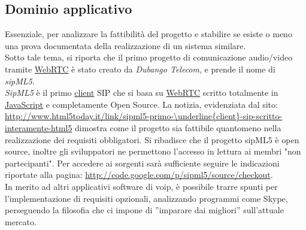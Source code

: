 \subsection{Dominio applicativo}
Essenziale, per analizzare la fattibilità del progetto e stabilire se esiste o meno una prova documentata della realizzazione di un sistema similare.\\ Sotto tale tema, si riporta che il primo progetto di comunicazione audio/video tramite \underline{WebRTC} è stato creato da \textit{Dubango Telecom}, e prende il nome di \textit{sipML5}.\\ \textit{SipML5} è il primo \underline{client} SIP che si basa su \underline{WebRTC} scritto totalmente in \underline{JavaScript} e completamente Open Source. La notizia, evidenziata dal sito: \url{http://www.html5today.it/link/sipml5-primo-\underline{client}-sip-scritto-interamente-html5} dimostra come il progetto sia fattibile quantomeno nella realizzazione dei requisiti obbligatori. Si ribadisce che il progetto sipML5 è open source, inoltre gli sviluppatori ne permettono l'accesso in lettura ai membri "non partecipanti". Per accedere ai sorgenti sarà sufficiente seguire le indicazioni riportate alla pagina: \url{http://code.google.com/p/sipml5/source/checkout}.\\In merito ad altri applicativi software di voip, è possibile trarre spunti per l'implementazione di requisiti opzionali, analizzando programmi come Skype, perseguendo la filosofia che ci impone di ''imparare dai migliori'' sull'attuale mercato.

